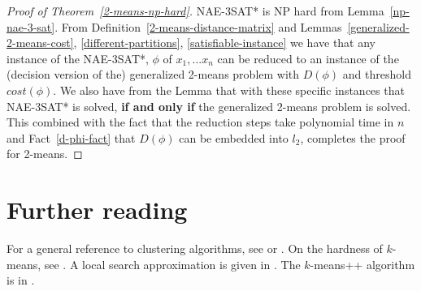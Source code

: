 \begin{proof}[Proof of Theorem~\ref{2-means-np-hard}]
NAE-3SAT* is NP hard from Lemma~\ref{np-nae-3-sat}.  From
Definition~\ref{2-means-distance-matrix} and
Lemmas~\ref{generalized-2-means-cost}, \ref{different-partitions},
\ref{satisfiable-instance} we have that any instance of the NAE-3SAT*,
$\phi$ of $x_1,...x_n$ can be reduced to an instance of the (decision
version of the) generalized 2-means problem with $D(\phi)$ and
threshold $cost(\phi)$.  We also have from the Lemma that with these
specific instances that NAE-3SAT* is solved, \textbf{if and only if}
the generalized 2-means problem is solved.  This combined with the
fact that the reduction steps take polynomial time in $n$ and
Fact~\ref{d-phi-fact} that $D(\phi)$ can be embedded into $l_2$,
completes the proof for 2-means. 
\end{proof}





\section{Further reading}
For a general reference to clustering algorithms, see \cite{har75}
or \cite{gon85}. On the hardness of $k$-means, see \cite{das2008}.
A local search approximation is given in \cite{kan2004}. The 
$k$-means++ algorithm is in \cite{art2007}.

